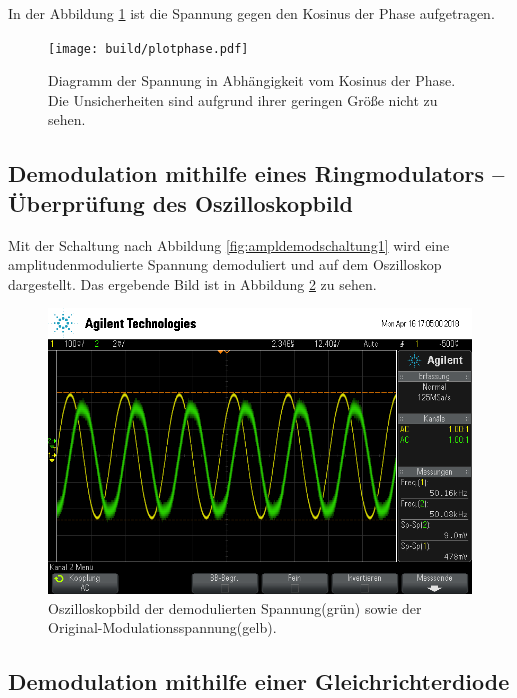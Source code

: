 In der Abbildung \ref{fig:plotphase} ist die Spannung gegen den Kosinus der Phase aufgetragen.

\begin{figure}
  \centering
  \texttt{[image: build/plotphase.pdf]}
  \caption{Diagramm der Spannung in Abhängigkeit vom Kosinus der Phase. Die Unsicherheiten sind aufgrund ihrer geringen Größe nicht zu sehen.}
  \label{fig:plotphase}
\end{figure}

\subsection{Demodulation mithilfe eines Ringmodulators -- Überprüfung des Oszilloskopbild}

Mit der Schaltung nach Abbildung \ref{fig:ampldemodschaltung1} wird eine amplitudenmodulierte Spannung demoduliert und auf dem Oszilloskop dargestellt. Das ergebende Bild ist in Abbildung \ref{fig:demodRing} zu sehen.

\begin{figure}[h]
  \centering
  \includegraphics[width=.9\textwidth]{Oszi_Pics/demodRing.png}
  \caption{Oszilloskopbild der demodulierten Spannung(grün) sowie der Original-Modulationsspannung(gelb).}
  \label{fig:demodRing}
\end{figure}

\subsection{Demodulation mithilfe einer Gleichrichterdiode}

